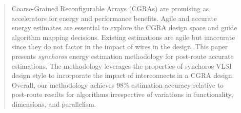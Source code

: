 \begin{abstract}
Coarse-Grained Reconfigurable Arrays (CGRAs) are promising as accelerators for energy and performance benefits.
Agile and accurate energy estimates are essential to explore the CGRA design space and guide algorithm mapping decisions.
Existing estimations are agile but inaccurate since they do not factor in the impact of wires in the design. 
This paper presents \textit{synchoros} energy estimation methodology for post-route accurate estimations.
The methodology leverages the properties of synchoros VLSI design style to incorporate the impact of interconnects in a CGRA design.
Overall, our methodology achieves 98\% estimation accuracy relative to post-route results for algorithms irrespective of variations in functionality, dimensions, and parallelism. 
\end{abstract}